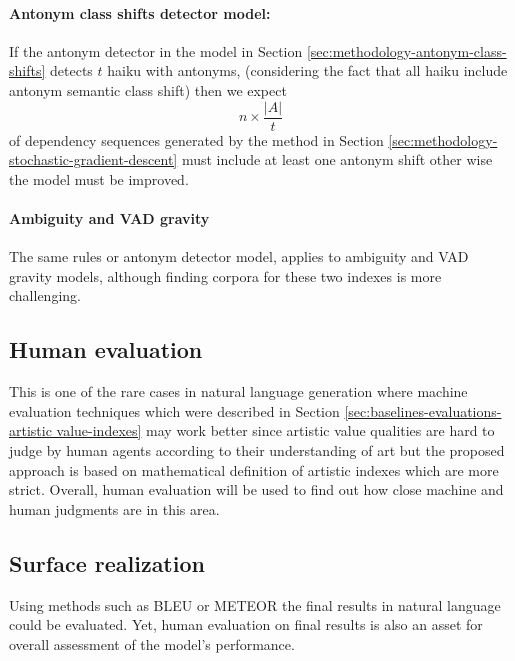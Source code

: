 \documentclass{article}
\begin{document}
	\paragraph{Antonym class shifts detector model:} If the antonym detector in the model in Section \ref{sec:methodology-antonym-class-shifts} detects $t$ haiku with antonyms, (considering the fact that all haiku include antonym semantic class shift) then we expect 
	\begin{equation}
	n \times \frac{|A|}{t}
	\end{equation}
	of dependency sequences generated by the method in Section \ref{sec:methodology-stochastic-gradient-descent} must include at least one antonym shift other wise the model must be improved. 
	\paragraph{Ambiguity and VAD gravity} The same rules or antonym detector model, applies to ambiguity and VAD gravity models, although finding corpora for these two indexes is more challenging.  
	\subsection{Human evaluation} 
	This is one of the rare cases in natural language generation where machine evaluation techniques which were described in Section \ref{sec:baselines-evaluations-artistic value-indexes} may work better since artistic value qualities are hard to judge by human agents according to their understanding of art but the proposed approach is based on mathematical definition of artistic indexes which are more strict. Overall, human evaluation will be used to find out how close machine and human judgments are in this area. 
	\subsection{Surface realization} 
	Using methods such as BLEU \citep{papineni-2002-bleu-a-method-for-automatic-evaluation-of-machine-translation} or METEOR \citep{lavie-2007-proceedings-of-the-acl-workshop-on-intrinsic-and-extrinsic-evaluation-measures-for-machine-translation-and-or-summarization} the final results in natural language could be evaluated. Yet, human evaluation on final results is also an asset for overall assessment of the model's performance. %
	
\end{document}
